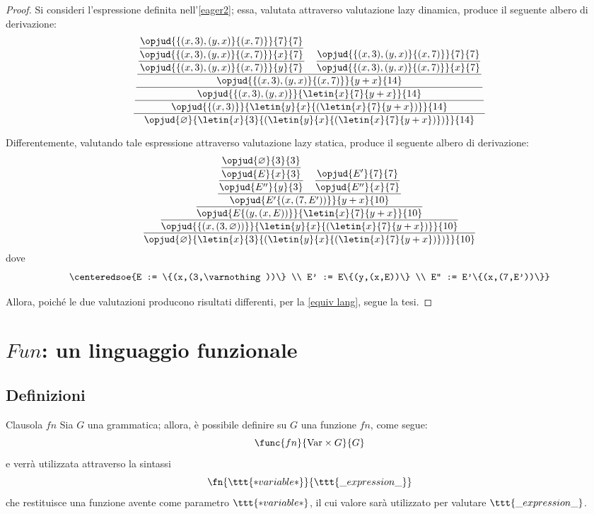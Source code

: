 \documentclass[a4paper, 12pt]{report}
\begin{document}
    \begin{proof}
        Si consideri l'espressione definita nell'\cref{eager2}; essa, valutata attraverso valutazione lazy dinamica, produce il seguente albero di derivazione: $$\dfrac{\dfrac{\dfrac{\dfrac{\dfrac{\dfrac{\opjud{\{(x,3),(y,x)\}\{(x,7)\}}{7}{7}}{\opjud{\{(x,3),(y,x)\}\{(x,7)\}}{x}{7}}}{\opjud{\{(x,3),(y,x)\}\{(x,7)\}}{y}{7}} \quad \dfrac{\opjud{\{(x,3),(y,x)\}\{(x,7)\}}{7}{7}}{\opjud{\{(x,3),(y,x)\}\{(x,7)\}}{x}{7}}}{\opjud{\{(x,3),(y,x)\}\{(x,7)\}}{y+x}{14}}}{\opjud{\{(x,3),(y,x)\}}{\letin{x}{7}{y+x}}{14}}}{\opjud{\{(x,3)\}}{\letin{y}{x}{(\letin{x}{7}{y+x})}}{14}}}{\opjud{\varnothing}{\letin{x}{3}{(\letin{y}{x}{(\letin{x}{7}{y+x})})}}{14}}$$

        Differentemente, valutando tale espressione attraverso valutazione lazy statica, produce il seguente albero di derivazione: $$\dfrac{\dfrac{\dfrac{\dfrac{\dfrac{\dfrac{\opjud{\varnothing}{3}{3}}{\opjud{E}{x}{3}}}{\opjud{E''}{y}{3}} \quad \dfrac{\opjud{E'}{7}{7}}{\opjud{E''}{x}{7}}}{\opjud{E'\{(x,(7,E'))\}}{y+x}{10}}}{\opjud{E\{(y,(x, E))\}}{\letin{x}{7}{y+x}}{10}}}{\opjud{\{(x,(3,\varnothing))\}}{\letin{y}{x}{(\letin{x}{7}{y+x})}}{10}}}{\opjud{\varnothing}{\letin{x}{3}{(\letin{y}{x}{(\letin{x}{7}{y+x})})}}{10}}$$ dove $$\centeredsoe{E := \{(x,(3,\varnothing))\} \\ E' := E\{(y,(x,E))\} \\ E'' := E'\{(x,(7,E'))\}}$$

        Allora, poiché le due valutazioni producono risultati differenti, per la \cref{equiv lang}, segue la tesi.
    \end{proof}

    \section{$Fun$: un linguaggio funzionale}

    \subsection{Definizioni}

    \begin{frameddefn}[label={fn}]{Clausola $fn$}
        Sia $G$ una grammatica; allora, è possibile definire su $G$ una funzione $fn$, come segue: $$\func{fn}{\mathrm{Var} \times G}{G}$$ e verrà utilizzata attraverso la sintassi $$\fn{\ttt{*variable*}}{\ttt{\_expression\_}}$$ che restituisce una funzione avente come parametro $\ttt{*variable*}$, il cui valore sarà utilizzato per valutare $\ttt{\_expression\_}$.
    \end{frameddefn}
\end{document}
